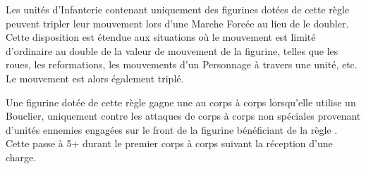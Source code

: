 \newcommand{\bombingrunrule}{%
Attaques au Passage. L'unité ennemie subit 2D6 touches de Force 3 avec la règle \armourpiercing{1}. Le nombre de touches n'augmente pas proportionnellement avec le nombre de figurines de l'unité.
}


\newcommand{\forgegunrule}{%
Arme de tir. \range{18}, Force 5, \flamingattacks, \quicktofire.
}

\newcommand{\flameculverinrule}{%
Canon à Flammes, \range{3}, Force 3, \flamingattacks. Cette arme ne peut pas tirer si elle a effectuée une marche forcée durant le tour. Ignorez le malus de -1 sur le tableau d'Incident de Tir.
}

\newcommand{\forgerepeaterrule}{%
Arme de tir. \range{18}, Force 5, \flamingattacks, \multipleshots{2D3}, \quicktofire.
}

\newcommand{\whirlingchainsofdoomrule}{%
Arme de base. Le porteur gagne +1 en Force et des \randomattacks{3D3} frappant à Initiative 10. Une figurine avec cette arme ne peut pas être rejointe par un personnage.
}

\newcommand{\swiwelgunrule}{%
Arme de tir. \range{24}, Force 4, \armourpiercing{1},  \multipleshots{4} et \quicktofire.
}





\startarmyspecialrules

\armyspecialruleentry{\relentless}

Les unités d'Infanterie contenant uniquement des figurines dotées de cette règle peuvent tripler leur mouvement lors d'une Marche Forcée au lieu de le doubler. Cette disposition est étendue aux situations où le mouvement est limité d'ordinaire au double de la valeur de mouvement de la figurine, telles que les roues, les reformations, les mouvements d'un Personnage à travers une unité, etc. Le mouvement est alors également triplé.

\armyspecialruleentry{\shieldwall}

Une figurine dotée de cette règle gagne une  au corps à corps lorsqu'elle utilise un Bouclier, uniquement contre les attaques de corps à corps non spéciales provenant d'unités ennemies engagées sur le front de la figurine bénéficiant de la règle \shieldwall{}. Cette \wardsave{} passe à 5+ durant le premier corps à corps suivant la réception d'une charge. 

\armyspecialruleentry{\holdstone}

